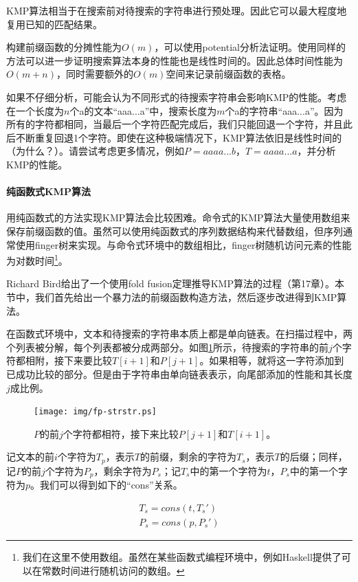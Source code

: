 \documentclass[UTF8]{article}
\begin{document}
KMP算法相当于在搜索前对待搜索的字符串进行预处理。因此它可以最大程度地复用已知的匹配结果。

构建前缀函数的分摊性能为$O(m)$，可以使用potential分析法证明\cite{CLRS}。使用同样的方法可以进一步证明搜索算法本身的性能也是线性时间的。因此总体时间性能为$O(m + n)$，同时需要额外的$O(m)$空间来记录前缀函数的表格。

如果不仔细分析，可能会认为不同形式的待搜索字符串会影响KMP的性能。考虑在一个长度为$n$个a的文本“aaa...a”中，搜索长度为$m$个a的字符串“aaa...a”。因为所有的字符都相同，当最后一个字符匹配完成后，我们只能回退一个字符，并且此后不断重复回退1个字符。即使在这种极端情况下，KMP算法依旧是线性时间的（为什么？）。请尝试考虑更多情况，例如$P = aaaa...b$，$T = aaaa...a$，并分析KMP的性能。

\paragraph{纯函数式KMP算法}

用纯函数式的方法实现KMP算法会比较困难。命令式的KMP算法大量使用数组来保存前缀函数的值。虽然可以使用纯函数式的序列数据结构来代替数组，但序列通常使用finger树来实现。与命令式环境中的数组相比，finger树随机访问元素的性能为对数时间\footnote{我们在这里不使用数组。虽然在某些函数式编程环境中，例如Haskell提供了可以在常数时间进行随机访问的数组。}。

Richard Bird给出了一个使用fold fusion定理推导KMP算法的过程（\cite{fp-pearls}第17章）。本节中，我们首先给出一个暴力法的前缀函数构造方法，然后逐步改进得到KMP算法。

在函数式环境中，文本和待搜索的字符串本质上都是单向链表。在扫描过程中，两个列表被分解，每个列表都被分成两部分。如图\ref{fig:fp-strstr}所示，待搜索的字符串的前$j$个字符都相附，接下来要比较$T[i+1]$和$P[j+1]$。如果相等，就将这一字符添加到已成功比较的部分。但是由于字符串由单向链表表示，向尾部添加的性能和其长度$j$成比例。

\begin{figure}[htbp]
 \centering
 \texttt{[image: img/fp-strstr.ps]}
 \caption{$P$的前$j$个字符都相符，接下来比较$P[j+1]$和$T[i+1]$。}
 \label{fig:fp-strstr}
\end{figure}

记文本的前$i$个字符为$T_p$，表示$T$的前缀，剩余的字符为$T_s$，表示$T$的后缀；同样，记$P$的前$j$个字符为$P_p$，剩余字符为$P_s$；记$T_s$中的第一个字符为$t$，$P_s$中的第一个字符为$p$。我们可以得到如下的“cons”关系。

\[
\begin{array}{l}
T_s = cons(t, T_s') \\
P_s = cons(p, P_s')
\end{array}
\]
\end{document}
